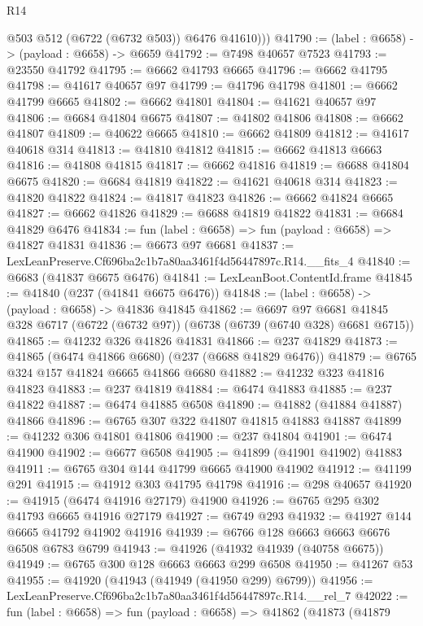 \begin{lexlean}{R14}
\begin{coremodule}
          @503
          @512
          (@6722 (@6732 @503))
          @6476
          @41610)))
@41790 := (label : @6658) -> (payload : @6658) -> @6659
@41792 := @7498 @40657 @7523
@41793 := @23550 @41792
@41795 := @6662 @41793 @6665
@41796 := @6662 @41795
@41798 := @41617 @40657 @97
@41799 := @41796 @41798
@41801 := @6662 @41799 @6665
@41802 := @6662 @41801
@41804 := @41621 @40657 @97
@41806 := @6684 @41804 @6675
@41807 := @41802 @41806
@41808 := @6662 @41807
@41809 := @40622 @6665
@41810 := @6662 @41809
@41812 := @41617 @40618 @314
@41813 := @41810 @41812
@41815 := @6662 @41813 @6663
@41816 := @41808 @41815
@41817 := @6662 @41816
@41819 := @6688 @41804 @6675
@41820 := @6684 @41819
@41822 := @41621 @40618 @314
@41823 := @41820 @41822
@41824 := @41817 @41823
@41826 := @6662 @41824 @6665
@41827 := @6662 @41826
@41829 := @6688 @41819 @41822
@41831 := @6684 @41829 @6476
@41834 := fun (label : @6658) => fun (payload : @6658) => @41827 @41831
@41836 := @6673 @97 @6681
@41837 := LexLeanPreserve.Cf696ba2c1b7a80aa3461f4d56447897c.R14.__fits_4
@41840 := @6683 (@41837 @6675 @6476)
@41841 := LexLeanBoot.ContentId.frame
@41845 := @41840 (@237 (@41841 @6675 @6476))
@41848 := (label : @6658) -> (payload : @6658) -> @41836 @41845
@41862 := @6697
    @97
    @6681
    @41845
    @328
    @6717
    (@6722 (@6732 @97))
    (@6738 (@6739 (@6740 @328) @6681 @6715))
@41865 := @41232 @326 @41826 @41831
@41866 := @237 @41829
@41873 := @41865 (@6474 @41866 @6680) (@237 (@6688 @41829 @6476))
@41879 := @6765 @324 @157 @41824 @6665 @41866 @6680
@41882 := @41232 @323 @41816 @41823
@41883 := @237 @41819
@41884 := @6474 @41883
@41885 := @237 @41822
@41887 := @6474 @41885 @6508
@41890 := @41882 (@41884 @41887) @41866
@41896 := @6765 @307 @322 @41807 @41815 @41883 @41887
@41899 := @41232 @306 @41801 @41806
@41900 := @237 @41804
@41901 := @6474 @41900
@41902 := @6677 @6508
@41905 := @41899 (@41901 @41902) @41883
@41911 := @6765 @304 @144 @41799 @6665 @41900 @41902
@41912 := @41199 @291
@41915 := @41912 @303 @41795 @41798
@41916 := @298 @40657
@41920 := @41915 (@6474 @41916 @27179) @41900
@41926 := @6765 @295 @302 @41793 @6665 @41916 @27179
@41927 := @6749 @293
@41932 := @41927 @144 @6665 @41792 @41902 @41916
@41939 := @6766 @128 @6663 @6663 @6676 @6508 @6783 @6799
@41943 := @41926 (@41932 @41939 (@40758 @6675))
@41949 := @6765 @300 @128 @6663 @6663 @299 @6508
@41950 := @41267 @53
@41955 := @41920 (@41943 (@41949 (@41950 @299) @6799))
@41956 := LexLeanPreserve.Cf696ba2c1b7a80aa3461f4d56447897c.R14.__rel_7
@42022 := fun (label : @6658) =>
  fun (payload : @6658) =>
  @41862
    (@41873
      (@41879

\end{coremodule}
\end{lexlean}
